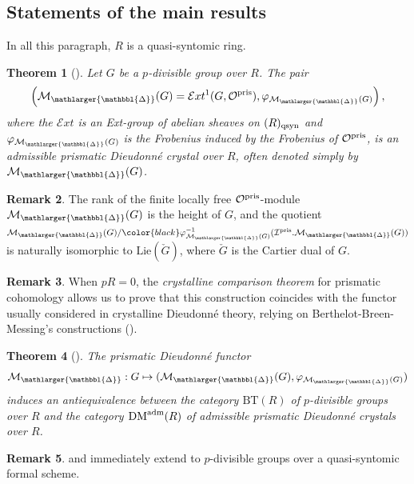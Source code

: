 \documentclass{amsart}
\newcommand{\prism}{{\mathlarger{\mathbbl{\Delta}}}}
\theoremstyle{plain}
\newtheorem{theorem}{Theorem}[subsection]
\theoremstyle{definition}
\newtheorem{remark}[theorem]{Remark}
\newcommand{\Ext}{\mathcal{E}xt}
\newcommand{\DM}{\mathrm{DM}}
\newcommand{\purple}[1]{{\color{black} #1}}
\newcommand{\red}[1]{{\color{black} #1}}
\begin{document}
\subsection{Statements of the main results}
In all this paragraph, $R$ is a quasi-syntomic ring.

\begin{theorem}[]
\label{sec:intro-main-theorem-1}
Let $G$ be a $p$-divisible group over $R$. The \red{pair
\[  \left(\mathcal{M}_{\prism}(G)=\Ext^1(G, \mathcal{O}^{\rm pris}), \varphi_{\mathcal{M}_{\prism}(G)} \right), \]
where the $\Ext$ is an Ext-group of abelian sheaves on $(R)_{\rm qsyn}$ and $\varphi_{\mathcal{M}_{\prism}(G)}$ is the Frobenius induced by the Frobenius of $\mathcal{O}^{\rm pris}$, is an admissible prismatic Dieudonn\'e crystal over $R$, often denoted simply by $\mathcal{M}_{\prism}(G)$. }
\end{theorem}


\begin{remark}
The rank of the finite locally free $\mathcal{O}^{\rm pris}$-module $\mathcal{M}_{\prism}(G)$ is the height of $G$, and the quotient $\mathcal{M}_{\prism}(G)/\red{\varphi_{\mathcal{M}_\prism(G)}^{-1}(\mathcal{I}^{\rm pris}.\mathcal{M}_{\prism}(G))}$ is naturally isomorphic to $\mathrm{Lie}(\check{G})$, where $\check{G}$ is the Cartier dual of $G$.
\end{remark}


\begin{remark}
When $pR=0$, the \textit{crystalline comparison theorem} for prismatic cohomology allows us to prove that this construction coincides with the functor usually considered in crystalline Dieudonn\'e theory, relying on Berthelot-Breen-Messing's constructions (\cite{berthelot_breen_messing_theorie_de_dieudonne_cristalline_II}).
\end{remark}

\begin{theorem}[] 
\label{sec:intro-main-theorem-2}
\red{The prismatic Dieudonn\'e functor 
\[ \mathcal{M}_{\prism} : G \mapsto (\mathcal{M}_{\prism}(G),\varphi_{\mathcal{M}_\prism(G)}) \]
induces an antiequivalence between the category $\mathrm{BT}(R)$ of $p$-divisible groups over $R$ and the category $\DM^{\rm adm}(R)$ of admissible prismatic Dieudonn\'e crystals over $R$.}
\end{theorem}

\begin{remark}
\purple{ and \Cref{sec:intro-main-theorem-2} immediately extend to $p$-divisible groups over a quasi-syntomic formal scheme.}
\end{remark}
\end{document}

